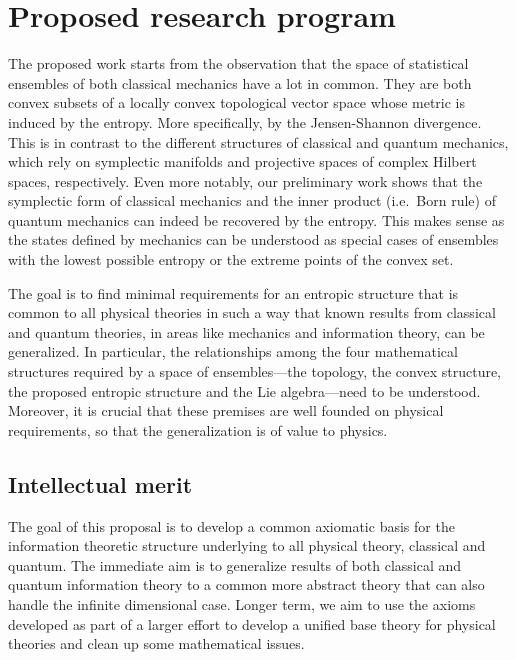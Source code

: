 \section{Proposed research program}

The proposed work starts from the observation that the space of statistical ensembles of both classical mechanics have a lot in common. They are both convex subsets of a locally convex topological vector space whose metric is induced by the entropy. More specifically, by the Jensen-Shannon divergence. This is in contrast to the different structures of classical and quantum mechanics, which rely on symplectic manifolds and projective spaces of complex Hilbert spaces, respectively. Even more notably, our preliminary work shows that the symplectic form of classical mechanics and the inner product (i.e.~Born rule) of quantum mechanics can indeed be recovered by the entropy. This makes sense as the states defined by mechanics can be understood as special cases of ensembles with the lowest possible entropy or the extreme points of the convex set.

The goal is to find minimal requirements for an entropic structure that is common to all physical theories in such a way that known results from classical and quantum theories, in areas like mechanics and information theory, can be generalized. In particular, the relationships among the four mathematical structures required by a space of ensembles---the topology, the convex structure, the proposed entropic structure and the Lie algebra---need to be understood. Moreover, it is crucial that these premises are well founded on physical requirements, so that the generalization is of value to physics.



\subsection{Intellectual merit}

The goal of this proposal is to develop a common axiomatic basis for the information theoretic structure underlying to all physical theory, classical and quantum. The immediate aim is to generalize results of both classical and quantum information theory to a common more abstract theory that can also handle the infinite dimensional case. Longer term, we aim to use the axioms developed as part of a larger effort to develop a unified base theory for physical theories and clean up some mathematical issues.

